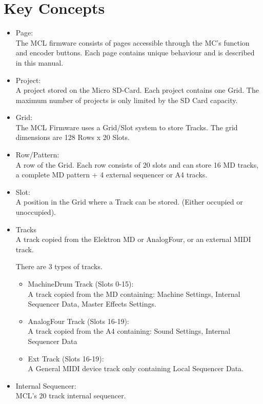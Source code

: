 \chapter{Key Concepts}

\begin{itemize}
\item Page:
\\
The MCL firmware consists of pages accessible through the MC's function and encoder buttons. Each page contains unique behaviour and is described in this manual.
\item Project:
\\
A project stored on the Micro SD-Card. Each project contains one Grid. 
The maximum number of projects is only limited by the SD Card capacity.

\item Grid:
\\
The MCL Firmware uses a Grid/Slot system to store Tracks. 
The grid dimensions are 128 Rows x 20 Slots. 

\item Row/Pattern:
\\
A row of the Grid. Each row consists of 20 slots and can store 16 MD tracks, a complete MD pattern + 4 external sequencer or A4 tracks.

\item Slot:
\\
A position in the Grid where a Track can be stored. (Either occupied or unoccupied).

\item Tracks
\\
A track copied from the Elektron MD or AnalogFour, or an external MIDI track.

There are 3 types of tracks.
\begin{itemize}

\item MachineDrum Track (Slots 0-15):\\
A track copied from the MD containing: Machine Settings, Internal Sequencer Data, Master Effects Settings.
\\
\item AnalogFour Track (Slots 16-19):\\

A track copied from the A4 containing: Sound Settings, Internal Sequencer Data
\\
\item Ext Track (Slots 16-19):\\

A General MIDI device track only containing Local Sequencer Data.
\\
\end{itemize}

\item Internal Sequencer:\\
MCL's 20 track internal sequencer.

\end{itemize}


